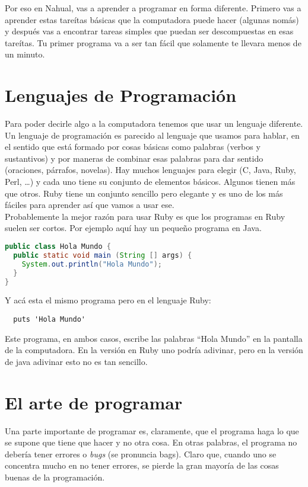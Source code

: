 Por eso en Nahual, vas a aprender a programar en forma diferente. Primero vas a aprender estas tareítas básicas que la computadora puede hacer (algunas nomás) y después vas a encontrar tareas simples que puedan ser descompuestas en esas tareítas. Tu primer programa va a ser tan fácil que solamente te llevara menos de un minuto.

\section{Lenguajes de Programación}
Para poder decirle algo a la computadora tenemos que usar un lenguaje diferente. Un lenguaje de programación es parecido al lenguaje que usamos para hablar, en el sentido que está formado por cosas básicas como palabras (verbos y sustantivos) y por maneras de combinar esas palabras para dar sentido (oraciones, párrafos, novelas). Hay muchos lenguajes para elegir (C, Java, Ruby, Perl, \ldots) y cada uno tiene su conjunto de elementos básicos. Algunos tienen más que otros. Ruby tiene un conjunto sencillo pero elegante y es uno de los más fáciles para aprender así que vamos a usar ese.\\
 
Probablemente la mejor razón para usar Ruby es que los programas en Ruby suelen ser cortos. Por ejemplo aquí hay un pequeño programa en Java.

\begin{lstlisting}[language=java]
public class Hola Mundo {
  public static void main (String [] args) {
    System.out.println("Hola Mundo");
  }
}
\end{lstlisting}

Y acá esta el mismo programa pero en el lenguaje Ruby:

\begin{lstlisting}
  puts 'Hola Mundo'
\end{lstlisting}

Este programa, en ambos casos, escribe las palabras ``Hola Mundo'' en la pantalla de la computadora. En la versión en Ruby uno podría adivinar, pero en la versión de java adivinar esto no es tan sencillo.

\section{El arte de programar}
Una parte importante de programar es, claramente, que el programa haga lo que se supone que tiene que hacer y no otra cosa. En otras palabras, el programa no debería tener errores o \emph{bugs} (se pronuncia bags). Claro que, cuando uno se concentra mucho en no tener errores, se pierde la gran mayoría de las cosas buenas de la programación.\\

